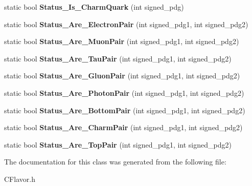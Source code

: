 \begin{DoxyCompactItemize}
\item 
\hypertarget{classToolSet_1_1CFlavor_a7dff55be1df93713579865e918e4f006}{
static bool {\bfseries Status\_\-Is\_\-CharmQuark} (int signed\_\-pdg)}
\label{classToolSet_1_1CFlavor_a7dff55be1df93713579865e918e4f006}

\item 
\hypertarget{classToolSet_1_1CFlavor_a3be3ffadd51336a99f13c535935581ae}{
static bool {\bfseries Status\_\-Are\_\-ElectronPair} (int signed\_\-pdg1, int signed\_\-pdg2)}
\label{classToolSet_1_1CFlavor_a3be3ffadd51336a99f13c535935581ae}

\item 
\hypertarget{classToolSet_1_1CFlavor_abc59b6968684d21d0de2aa5b493fcc9b}{
static bool {\bfseries Status\_\-Are\_\-MuonPair} (int signed\_\-pdg1, int signed\_\-pdg2)}
\label{classToolSet_1_1CFlavor_abc59b6968684d21d0de2aa5b493fcc9b}

\item 
\hypertarget{classToolSet_1_1CFlavor_a2050b271f8677852eba2296a9659a10a}{
static bool {\bfseries Status\_\-Are\_\-TauPair} (int signed\_\-pdg1, int signed\_\-pdg2)}
\label{classToolSet_1_1CFlavor_a2050b271f8677852eba2296a9659a10a}

\item 
\hypertarget{classToolSet_1_1CFlavor_aafeac0eba956b819920b2eb5c9b849b1}{
static bool {\bfseries Status\_\-Are\_\-GluonPair} (int signed\_\-pdg1, int signed\_\-pdg2)}
\label{classToolSet_1_1CFlavor_aafeac0eba956b819920b2eb5c9b849b1}

\item 
\hypertarget{classToolSet_1_1CFlavor_aebbfa1ed752fc217555c584be39a92e7}{
static bool {\bfseries Status\_\-Are\_\-PhotonPair} (int signed\_\-pdg1, int signed\_\-pdg2)}
\label{classToolSet_1_1CFlavor_aebbfa1ed752fc217555c584be39a92e7}

\item 
\hypertarget{classToolSet_1_1CFlavor_a8eff5f52b9dd22470557f204118e2386}{
static bool {\bfseries Status\_\-Are\_\-BottomPair} (int signed\_\-pdg1, int signed\_\-pdg2)}
\label{classToolSet_1_1CFlavor_a8eff5f52b9dd22470557f204118e2386}

\item 
\hypertarget{classToolSet_1_1CFlavor_a9b8f8be27a7dee97064ee3cc947ad863}{
static bool {\bfseries Status\_\-Are\_\-CharmPair} (int signed\_\-pdg1, int signed\_\-pdg2)}
\label{classToolSet_1_1CFlavor_a9b8f8be27a7dee97064ee3cc947ad863}

\item 
\hypertarget{classToolSet_1_1CFlavor_abc636cde8cbdf3e5789a962274ff1c89}{
static bool {\bfseries Status\_\-Are\_\-TopPair} (int signed\_\-pdg1, int signed\_\-pdg2)}
\label{classToolSet_1_1CFlavor_abc636cde8cbdf3e5789a962274ff1c89}

\end{DoxyCompactItemize}


The documentation for this class was generated from the following file:\begin{DoxyCompactItemize}
\item 
CFlavor.h\end{DoxyCompactItemize}
